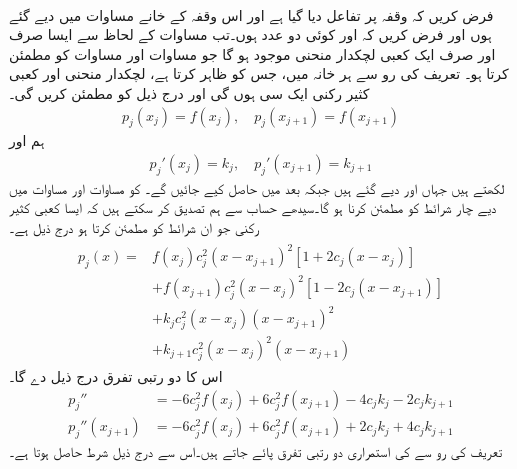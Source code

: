 \quad {}\\
فرض کریں کہ وقفہ  پر تفاعل  دیا گیا ہے اور اس وقفہ کے خانے مساوات  میں دیے گئے ہوں اور فرض کریں کہ  اور  کوئی دو عدد ہوں۔تب مساوات  کے لحاظ سے ایسا صرف اور صرف ایک کعبی لچکدار منحنی  موجود ہو گا جو مساوات  اور مساوات  کو مطمئن کرتا ہو۔
\quad
تعریف کی رو سے ہر خانہ  میں، جس کو  ظاہر کرتا ہے، لچکدار منحنی   اور کعبی کثیر رکنی  ایک سی  ہوں گی اور درج ذیل کو مطمئن کریں گی۔
\begin{align}\label{مساوات_اعدادی_لچکدار_منحنی_ٹکڑے_ت}
p_j(x_j)=f(x_j),\quad p_j(x_{j+1})=f(x_{j+1})
\end{align}
ہم  اور
\begin{align}\label{مساوات_اعدادی_لچکدار_منحنی_ٹکڑے_ٹ}
p_j'(x_j)=k_j,\quad p_j'(x_{j+1})=k_{j+1}
\end{align}
لکھتے ہیں جہاں  اور  دیے گئے ہیں جبکہ  بعد میں حاصل کیے جائیں گے۔ کو مساوات  اور مساوات  میں دیے چار شرائط کو مطمئن کرنا ہو گا۔سیدھے حساب سے ہم تصدیق کر سکتے ہیں کہ ایسا کعبی کثیر رکنی  جو ان شرائط کو مطمئن کرتا ہو درج ذیل ہے۔
\begin{gather}
\begin{aligned}\label{مساوات_اعدادی_لچکدار_منحنی_ٹکڑے_ث}
p_j(x)=&f(x_j)c_j^2(x-x_{j+1})^2[1+2c_j(x-x_j)]\\
&+f(x_{j+1})c_j^2(x-x_j)^2[1-2c_j(x-x_{j+1})]\\
&+k_jc_j^2(x-x_j)(x-x_{j+1})^2\\
&+k_{j+1}c_j^2(x-x_j)^2(x-x_{j+1})
\end{aligned}
\end{gather}
اس کا دو رتبی تفرق درج ذیل دے گا۔
\begin{align}
p_j''&=-6c_j^2f(x_j)+6c_j^2f(x_{j+1})-4c_jk_j-2c_jk_{j+1}\label{مساوات_اعدادی_دو_درجی_تفرق_الف}\\
p_j''(x_{j+1})&=-6c_j^2f(x_j)+6c_j^2f(x_{j+1})+2c_jk_j+4c_jk_{j+1}\label{مساوات_اعدادی_دو_درجی_تفرق_ب}
\end{align}
تعریف کی رو سے  کی استمراری دو رتبی تفرق پائے جاتے ہیں۔اس سے درج ذیل شرط حاصل ہوتا ہے۔
